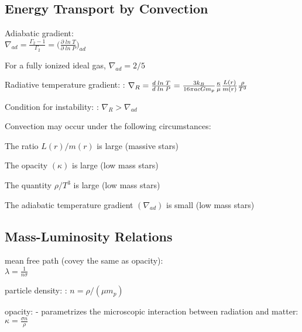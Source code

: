 \documentclass[a4paper, 11pt, landscape]{article}
\begin{document}
\begin{multicols*}{3}
\subsection{Energy Transport by Convection}
\begin{compactenum}
	\item [\color{red}Adiabatic gradient:] \\
	$\nabla_{ad} = \frac{\Gamma_{2} - 1}{\Gamma_{2}} = \Big(\frac{\partial \; ln \; T}{\partial \; ln \; P}\Big)_{ad}$
	\item For a fully ionized ideal gas, $\nabla_{ad} = 2/5$
	\item [\color{red}Radiative temperature gradient:]: $\\ \nabla_{R} = \frac{d\; ln \; T}{d\; ln \; P} = \frac{3 k_{B}}{16 \pi a c G m_{p}}\frac{\kappa}{\mu}\frac{L(r)}{m(r)}\frac{\rho}{T^{3}}$
	\item [\color{red}Condition for instability:]: $\nabla_{R} > \nabla_{ad}$
\end{compactenum}
Convection may occur under the following circumstances:
\begin{compactenum}
    \item The ratio $L(r)/m(r)$ is large (massive stars)
    \item The opacity $(\kappa)$ is large (low mass stars) 
    \item The quantity $\rho/T^{3}$ is large (low mass stars) 
    \item The adiabatic temperature gradient $(\nabla_{ad})$ is small (low mass stars) 
\end{compactenum}

\subsection{Mass-Luminosity Relations}
\begin{compactenum}
	\item mean free path (covey the same as opacity): \\ $\lambda = \frac{1}{n \sigma}$
	\item [\color{red}particle density:]: $n = \rho/(\mu m_{p})$
	\item [\color{red}opacity:] - parametrizes the microscopic interaction between radiation and matter: $\kappa = \frac{\sigma n}{\rho}$

\end{compactenum}
\end{multicols*}
\end{document}
